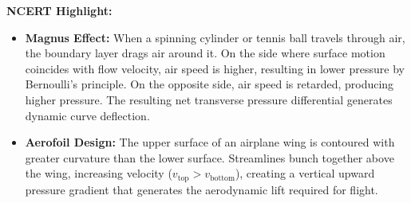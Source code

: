 \documentclass[10pt,a4paper]{article}
\begin{document}
\begin{ncertbox}
\textbf{NCERT Highlight:}
\begin{itemize}
  \item \textbf{Magnus Effect:} When a spinning cylinder or tennis ball travels through air, the boundary layer drags air around it. On the side where surface motion coincides with flow velocity, air speed is higher, resulting in lower pressure by Bernoulli's principle. On the opposite side, air speed is retarded, producing higher pressure. The resulting net transverse pressure differential generates dynamic curve deflection.
  \item \textbf{Aerofoil Design:} The upper surface of an airplane wing is contoured with greater curvature than the lower surface. Streamlines bunch together above the wing, increasing velocity ($v_{\text{top}} > v_{\text{bottom}}$), creating a vertical upward pressure gradient that generates the aerodynamic lift required for flight.
\end{itemize}
\end{ncertbox}
\end{document}
